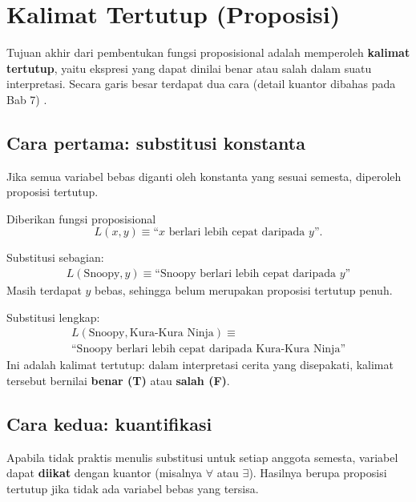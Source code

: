 \section{Kalimat Tertutup (Proposisi)}

Tujuan akhir dari pembentukan fungsi proposisional adalah memperoleh \textbf{kalimat tertutup}, yaitu ekspresi yang dapat dinilai benar atau salah dalam suatu interpretasi. Secara garis besar terdapat dua cara (detail kuantor dibahas pada Bab 7) \cite{rosen2019}.

\subsection{Cara pertama: substitusi konstanta}

Jika semua variabel bebas diganti oleh konstanta yang sesuai semesta, diperoleh proposisi tertutup.

\begin{contoh}
Diberikan fungsi proposisional
\[ L(x, y) \equiv \text{``}x \text{ berlari lebih cepat daripada } y\text{''}. \]

Substitusi sebagian:
\begin{multline*}
L(\text{Snoopy}, y) \equiv \text{``Snoopy berlari lebih cepat daripada } y\text{''}
\end{multline*}
Masih terdapat $y$ bebas, sehingga belum merupakan proposisi tertutup penuh.

Substitusi lengkap:
\begin{multline*}
L(\text{Snoopy}, \text{Kura-Kura Ninja}) \equiv {}\\
\text{``Snoopy berlari lebih cepat daripada Kura-Kura Ninja''}
\end{multline*}
Ini adalah kalimat tertutup: dalam interpretasi cerita yang disepakati, kalimat tersebut bernilai \textbf{benar (T)} atau \textbf{salah (F)}.
\end{contoh}

\subsection{Cara kedua: kuantifikasi}

Apabila tidak praktis menulis substitusi untuk setiap anggota semesta, variabel dapat \textbf{diikat} dengan kuantor (misalnya $\forall$ atau $\exists$). Hasilnya berupa proposisi tertutup jika tidak ada variabel bebas yang tersisa.

